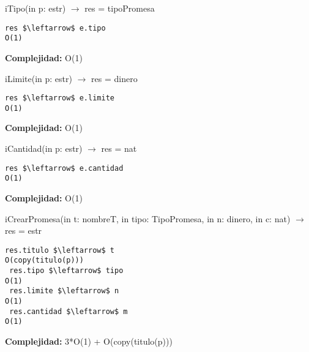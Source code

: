 iTipo(in p: estr) $\rightarrow$ res = tipoPromesa
\begin{lstlisting}[mathescape]
 res $\leftarrow$ e.tipo                                                                  O(1)
\end{lstlisting}
\textbf{Complejidad:} O(1)

iLimite(in p: estr) $\rightarrow$ res = dinero
\begin{lstlisting}[mathescape]
 res $\leftarrow$ e.limite                                                                O(1)
\end{lstlisting}
\textbf{Complejidad:} O(1)


iCantidad(in p: estr) $\rightarrow$ res = nat
\begin{lstlisting}[mathescape]
 res $\leftarrow$ e.cantidad                                                              O(1)
\end{lstlisting}
\textbf{Complejidad:} O(1)

iCrearPromesa(in t: nombreT, in tipo: TipoPromesa, in n: dinero, in c: nat) $\rightarrow$ res = estr
\begin{lstlisting}[mathescape]
 res.titulo $\leftarrow$ t                                                            O(copy(titulo(p)))
 res.tipo $\leftarrow$ tipo                                                               O(1)
 res.limite $\leftarrow$ n                                                                O(1)
 res.cantidad $\leftarrow$ m                                                              O(1)
\end{lstlisting}
\textbf{Complejidad:} 3*O(1) + O(copy(titulo(p)))


